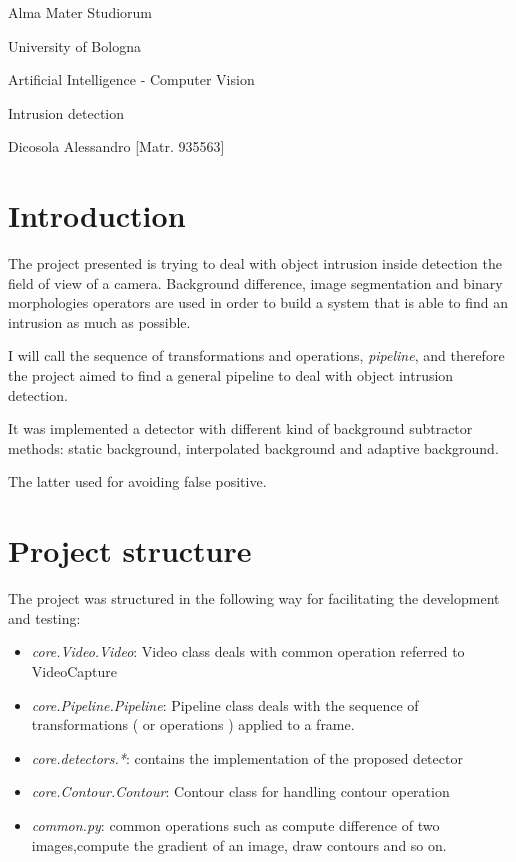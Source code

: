 \documentclass{article}
\begin{document}
\begin{titlepage}
    \vspace*{1cm}

    \begin{center}
        \Huge{Alma Mater Studiorum

            University of Bologna }
    \end{center}

    \vspace*{5 cm}
    \begin{center}
        \LARGE{Artificial Intelligence - Computer Vision}

        \Large Intrusion detection

        \large {Dicosola Alessandro [Matr. 935563]}
    \end{center}
\end{titlepage}

\section{Introduction}
The project presented is trying to deal with object intrusion inside detection the field of view of a camera.
Background difference, image segmentation and binary morphologies operators are used in order to build a system that is able to find an intrusion as much as possible.

I will call the sequence of transformations and operations, \textit{pipeline}, and therefore the project aimed to find a general pipeline to deal with object intrusion detection.

It was implemented a detector with different kind of background subtractor methods: static background, interpolated background and adaptive background.

The latter used for avoiding false positive.

\section{Project structure}
The project was structured in the following way for facilitating the development and testing:
\begin{itemize}
    \item \textit{core.Video.Video}: Video class deals with common operation referred to VideoCapture
    \item \textit{core.Pipeline.Pipeline}: Pipeline class deals with the sequence of transformations ( or operations ) applied to a frame.
    \item \textit{core.detectors.*}: contains the implementation of the proposed detector
    \item \textit{core.Contour.Contour}: Contour class for handling contour operation
    \item \textit{common.py}: common operations such as compute difference of two images,compute the gradient of an image, draw contours and so on.
\end{itemize}
\end{document}
